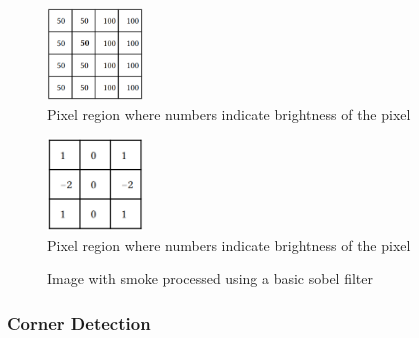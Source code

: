 \documentclass[lettersize,journal]{IEEEtran}
\begin{document}
\begin{figure}
        \centering
        \includegraphics[width=1in]{sobel_pixels.png}
        \caption{Pixel region where numbers indicate brightness of the pixel}
        \label{pixregion}
\end{figure}

\begin{figure}
        \centering
        \includegraphics[width=1in]{gradient_filter.png}
        \caption{Pixel region where numbers indicate brightness of the pixel}
        \label{gradfilter}
\end{figure}

\begin{figure}
        \centering
        \hfil
        \caption{Image with smoke processed using a basic sobel filter}
        \label{sobelimg}
\end{figure}

\subsubsection{Corner Detection}
\end{document}
